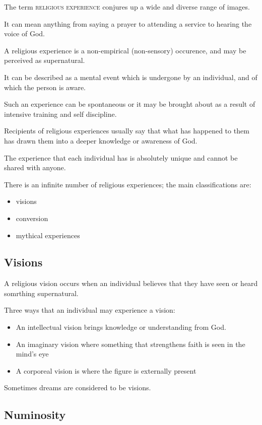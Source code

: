 \documentclass{article}
\begin{document}
The term \textsc{religious experience} conjures up a wide and diverse range of images.

It can mean anything from saying a prayer to attending a service to hearing the voice of God.

A religious experience is a non-empirical (non-sensory) occurence, and may be perceived as supernatural.

It can be described as a mental event which is undergone by an individual, and of which the person is aware.

Such an experience can be spontaneous or it may be brought about as a result of intensive training and self discipline.

Recipients of religious experiences usually say that what has happened to them has drawn them into a deeper knowledge or awareness of God.

The experience that each individual has is absolutely unique and cannot be shared with anyone.

There is an infinite number of religious experiences; the main classifications are:
\begin{itemize}
\item visions
\item conversion
\item mythical experiences
\end{itemize}

\subsection*{Visions}

A religious vision occurs when an individual believes that they have seen or heard somrthing supernatural.

Three ways that an individual may experience a vision:
\begin{itemize}
\item An intellectual vision brings knowledge or understanding from God.
\item An imaginary vision where something that strengthens faith is seen in the mind's eye
\item A corporeal vision is where the figure is externally present
\end{itemize}
Sometimes dreams are considered to be visions.

\subsection*{Numinosity}
\end{document}
